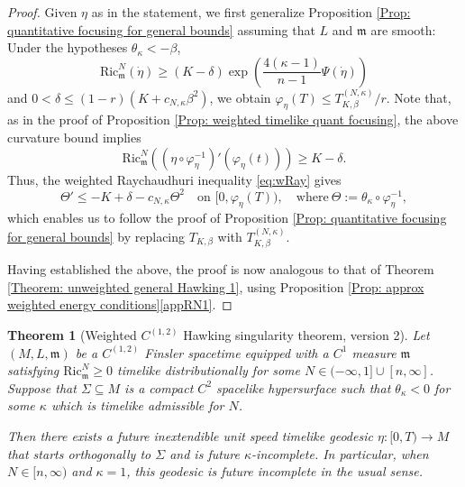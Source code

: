 \documentclass[a4paper,11pt]{article}
\numberwithin{equation}{section}
\theoremstyle{definition}
\theoremstyle{plain}
\newtheorem{Theorem}[Definition]{Theorem}
\newcommand{\Ric}{\mathrm{Ric}}
\newcommand{\m}{\mathfrak m}
\begin{document}
\begin{proof}
Given $\eta$ as in the statement, we first generalize Proposition \ref{Prop: quantitative focusing for general bounds} assuming that $L$ and $\m$ are smooth:
Under the hypotheses $\theta_\kappa <-\beta$,
\[
\Ric^N_\m (\dot{\eta}) \ge (K-\delta) \exp\left(
        \frac{4(\kappa-1)}{n-1}\Psi(\dot\eta)
    \right)
\]
and $0<\delta \le (1-r)(K+c_{N,\kappa}\beta^2)$, we obtain
$\varphi_\eta(T) \leq T^{(N,\kappa)}_{K,\beta}/r$.
Note that, as in the proof of Proposition \ref{Prop: weighted timelike quant focusing}, the above curvature bound implies
\[
\Ric^N_\m \left(
        (\eta\circ\varphi_\eta^{-1})'
        (\varphi_\eta(t))
    \right) \geq K-\delta.
\]
Thus, the weighted Raychaudhuri inequality \eqref{eq:wRay} gives
\[
    \Theta' \leq -K+\delta-c_{N,\kappa}\Theta^2
    \quad\text{on }[0,\varphi_\eta(T)),
    \quad \text{where}\ \Theta:=\theta_\kappa \circ \varphi_{\eta}^{-1},
\]
which enables us to follow the proof of Proposition \ref{Prop: quantitative focusing for general bounds} by replacing $T_{K,\beta}$ with $T^{(N,\kappa)}_{K,\beta}$.

Having established the above, the proof is now analogous to that of Theorem \ref{Theorem: unweighted general Hawking 1}, using Proposition \ref{Prop: approx weighted energy conditions}\ref{appRN1}.
\end{proof}


\begin{Theorem}[Weighted $C^{(1,2)}$ Hawking singularity theorem, version 2]
\label{Theorem: Weighted Hawking 2}
Let $(M,L,\mathfrak m)$ be a $C^{(1,2)}$ Finsler spacetime equipped with a $C^1$ measure $\mathfrak m$ satisfying $\Ric^N_{\mathfrak m}\geq0$ timelike distributionally for some $N\in(-\infty,1]\cup[n,\infty]$.
Suppose that $\Sigma\subseteq M$ is a compact $C^2$ spacelike hypersurface such that $\theta_\kappa<0$ for some $\kappa$ which is timelike admissible for $N$.

Then there exists a future inextendible unit speed timelike geodesic $\eta:[0,T)\to M$ that starts orthogonally to $\Sigma$ and is future $\kappa$-incomplete.
In particular, when $N\in[n,\infty)$ and $\kappa=1$, this geodesic is future incomplete in the usual sense.
\end{Theorem}
\end{document}
